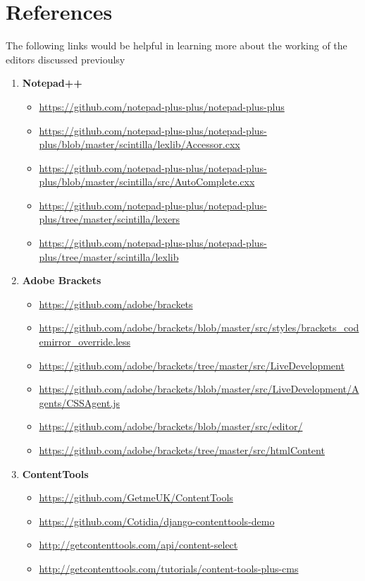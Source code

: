 \section{References}
The following links would be helpful in learning more about the working of the editors discussed previoulsy
\begin{enumerate}
\item\textbf{Notepad++}
\begin{itemize}
\item \url{https://github.com/notepad-plus-plus/notepad-plus-plus}
\item \url{https://github.com/notepad-plus-plus/notepad-plus-plus/blob/master/scintilla/lexlib/Accessor.cxx}
\item \url{https://github.com/notepad-plus-plus/notepad-plus-plus/blob/master/scintilla/src/AutoComplete.cxx}
\item \url{https://github.com/notepad-plus-plus/notepad-plus-plus/tree/master/scintilla/lexers}
\item \url{https://github.com/notepad-plus-plus/notepad-plus-plus/tree/master/scintilla/lexlib}
\end{itemize}
\item\textbf{Adobe Brackets}
\begin{itemize}
\item \url{https://github.com/adobe/brackets}
\item \url{https://github.com/adobe/brackets/blob/master/src/styles/brackets_codemirror_override.less}
\item \url{https://github.com/adobe/brackets/tree/master/src/LiveDevelopment}
\item \url{https://github.com/adobe/brackets/blob/master/src/LiveDevelopment/Agents/CSSAgent.js}
\item \url{https://github.com/adobe/brackets/blob/master/src/editor/}
\item \url{https://github.com/adobe/brackets/tree/master/src/htmlContent}
\end{itemize}
\item\textbf{ContentTools}
\begin{itemize}
\item \url{https://github.com/GetmeUK/ContentTools}
\item \url{https://github.com/Cotidia/django-contenttools-demo}
\item \url{http://getcontenttools.com/api/content-select}
\item \url{http://getcontenttools.com/tutorials/content-tools-plus-cms}
\end{itemize}
\end{enumerate}


